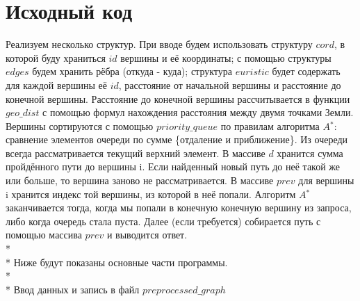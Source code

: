 \section{Исходный код}
Реализуем несколько структур. При вводе будем использовать структуру $cord$, в которой буду храниться $id$ вершины и её координаты; с помощью структуры $edges$ будем хранить рёбра (откуда - куда); структура $euristic$ будет содержать для каждой вершины её $id$, расстояние от начальной вершины и расстояние до конечной вершины. Расстояние до конечной вершины рассчитывается в функции $geo\_dist$ с помощью формул нахождения расстояния между двумя точками Земли. Вершины сортируются с помощью $priority\_queue$ по правилам алгоритма $A$$^*$: сравнение элементов очереди по сумме \{отдаление и приближение\}. Из очереди всегда рассматривается текущий верхний элемент. В массиве $d$ хранится сумма пройдённого пути до вершины i. Если найденный новый путь до неё такой же или больше, то вершина заново не рассматривается. В массиве $prev$ для вершины i хранится индекс той вершины, из которой в неё попали. Алгоритм $A$$^*$ заканчивается тогда, когда мы попали в конечную конечную вершину из запроса, либо когда очередь стала пуста. Далее (если требуется) собирается путь с помощью массива $prev$ и выводится ответ.
\\*\\*
Ниже будут показаны основные части программы.
\\*\\*
Ввод данных и запись в файл $preprocessed\_graph$
